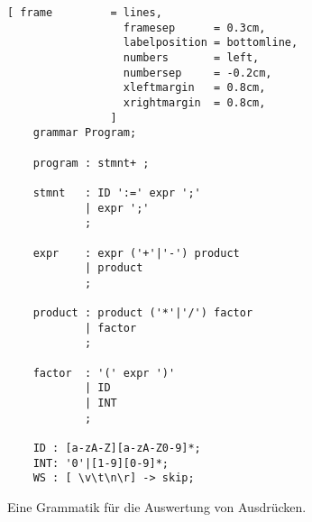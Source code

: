 \begin{figure}[!ht]
\centering
\begin{Verbatim}[ frame         = lines, 
                  framesep      = 0.3cm, 
                  labelposition = bottomline,
                  numbers       = left,
                  numbersep     = -0.2cm,
                  xleftmargin   = 0.8cm,
                  xrightmargin  = 0.8cm,
                ]
    grammar Program;
    
    program : stmnt+ ;
    
    stmnt   : ID ':=' expr ';'
            | expr ';'
            ;    
    
    expr    : expr ('+'|'-') product
            | product
            ;
    
    product : product ('*'|'/') factor
            | factor
            ;
    
    factor  : '(' expr ')'
            | ID
            | INT
            ;
    
    ID : [a-zA-Z][a-zA-Z0-9]*;
    INT: '0'|[1-9][0-9]*;
    WS : [ \v\t\n\r] -> skip; 
\end{Verbatim}
\vspace*{-0.3cm}
\caption{Eine Grammatik f\"ur die Auswertung von Ausdr\"ucken.}
\label{fig:Program.g4}
\end{figure}


